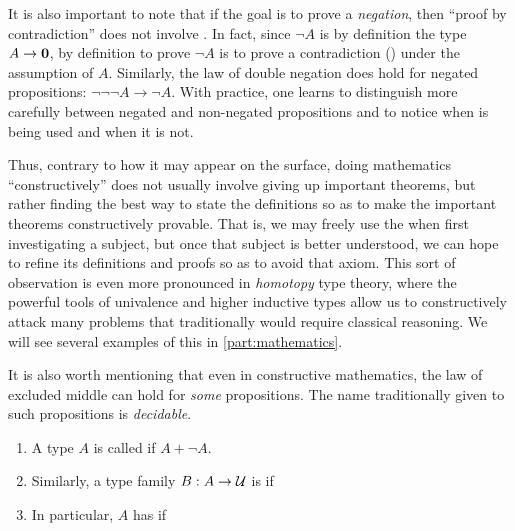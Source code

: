 It is also important to note that if the goal is to prove a \emph{negation}, then ``proof by contradiction'' does not involve \LEM{}.
In fact, since $\neg A$ is by definition the type $A\to\mathbf{0}$, by definition to prove $\neg A$ is to prove a contradiction (\emptyt) under the assumption of $A$.
Similarly, the law of double negation does hold for negated propositions: $\neg\neg\neg A \to \neg A$.
With practice, one learns to distinguish more carefully between negated and non-negated propositions and to notice when \LEM{} is being used and when it is not.

Thus, contrary to how it may appear on the surface, doing mathematics ``constructively'' does not usually involve giving up important theorems, but rather finding the best way to state the definitions so as to make the important theorems constructively provable.
That is, we may freely use the \LEM{} when first investigating a subject, but once that subject is better understood, we can hope to refine its definitions and proofs so as to avoid that axiom.
This sort of observation is even more pronounced in \emph{homotopy} type theory, where the powerful tools of univalence and higher inductive types allow us to constructively attack many problems that traditionally would require classical reasoning.
We will see several examples of this in \autoref{part:mathematics}.

It is also worth mentioning that even in constructive mathematics, the law of excluded middle can hold for \emph{some} propositions.
The name traditionally given to such propositions is \emph{decidable}.

\begin{defn}\label{defn:decidable-equality}
  \mbox{}
  \begin{enumerate}
  \item A type $A$ is called 
    if $A+\neg A$.
  \item Similarly, a type family $B:A\to \mathcal{U}$ is 
    if 
  \item In particular, $A$ has 
    if 
  \end{enumerate}
\end{defn}

